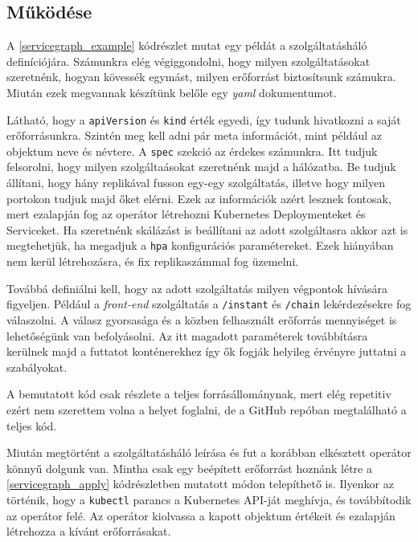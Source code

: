 
\subsection{Működése}
A \ref{servicegraph_example} kódrészlet mutat egy példát a szolgáltatásháló definíciójára. Számunkra elég végiggondolni, hogy milyen szolgáltatásokat szeretnénk, hogyan kövessék egymást, milyen erőforrást biztosítsunk számukra. Miután ezek megvannak készítünk belőle egy \textit{yaml} dokumentumot.

Látható, hogy a \verb+apiVersion+ és \verb+kind+ érték egyedi, így tudunk hivatkozni a saját erőforrásunkra. Szintén meg kell adni pár meta információt, mint például az objektum neve és névtere. A \verb+spec+ szekció az érdekes számunkra. Itt tudjuk felsorolni, hogy milyen szolgáltaásokat szeretnénk majd a hálózatba. Be tudjuk állítani, hogy hány replikával fusson egy-egy szolgáltatás, illetve hogy milyen portokon tudjuk majd őket elérni. Ezek az információk azért lesznek fontosak, mert ezalapján fog az operátor létrehozni Kubernetes Deploymenteket és Serviceket. Ha szeretnénk skálázást is beállítani az adott szolgáltasra akkor azt is megtehetjük, ha megadjuk a \verb+hpa+ konfigurációs paramétereket. Ezek hiányában nem kerül létrehozásra, és fix replikaszámmal fog üzemelni.

Továbbá definiálni kell, hogy az adott szolgáltatás milyen végpontok hívására figyeljen. Például a \textit{front-end} szolgáltatás a \verb+/instant+ és \verb+/chain+ lekérdezésekre fog válaszolni. A válasz gyorsasága és a közben felhasznált erőforrás mennyiséget is lehetőségünk van befolyásolni. Az itt magadott paraméterek továbbításra kerülnek majd a futtatot konténerekhez így ők fogják helyileg érvényre juttatni a szabályokat. 

A bemutatott kód csak részlete a teljes forrásállománynak, mert elég repetitiv ezért nem szerettem volna a helyet foglalni, de a GitHub repóban megtalálható a teljes kód. \\

\lstset{caption=Saját szolgáltatásháló definiálása, label=servicegraph_example}


Miután megtörtént a szolgáltatásháló leírása és fut a korábban elkésztett operátor könnyű dolgunk van. Mintha csak egy beépített erőforrást hoznánk létre a \ref{servicegraph_apply} kódrészletben mutatott módon telepíthető is. 
Ilyenkor az történik, hogy a \verb+kubectl+ parancs a Kubernetes API-ját meghívja, és továbbítodik az operátor felé. Az operátor kiolvassa a kapott objektum értékeit és ezalapján létrehozza a kívánt erőforrásakat. 

